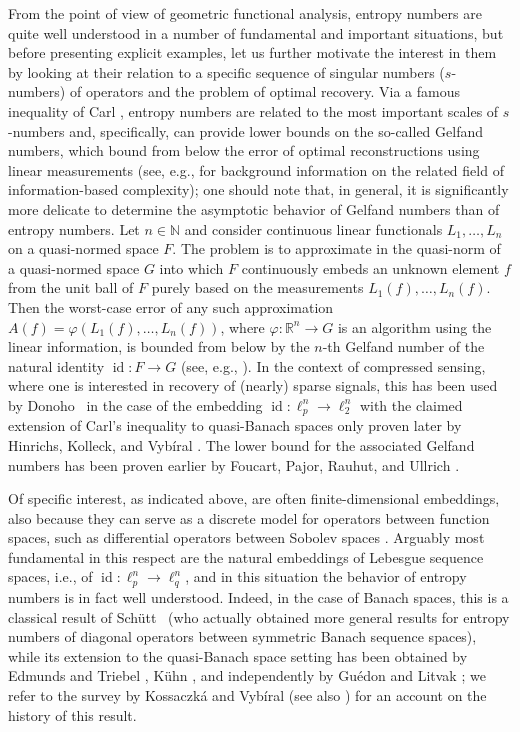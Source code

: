 \documentclass[a4paper,12pt]{article}
\theoremstyle{definition}
\newcommand{\N}{\mathbb{N}}
\newcommand{\IR}{\mathbb{R}}
\DeclareMathOperator{\id}{id}
\begin{document}
From the point of view of geometric functional analysis, entropy numbers are quite well understood in a number of fundamental and important situations, but before presenting explicit examples, let us further motivate the interest
in them by looking at their relation to a specific sequence of singular numbers ($s$-numbers) of operators and the problem of optimal recovery.  Via a famous inequality of Carl \cite{C1981}, entropy numbers are related to the most important scales of $s$-numbers and, specifically, can provide lower bounds on the so-called Gelfand numbers,
which bound from below the error of optimal reconstructions using linear measurements (see, e.g., \cite{NW08} for background information on the related field of information-based complexity); one should note that,
in general, it is significantly more delicate to determine the asymptotic behavior of Gelfand numbers than of entropy numbers. Let $n\in\N$ and consider continuous linear functionals $L_1,\dots,L_n$ on a quasi-normed space $F$.
The problem is to approximate in the quasi-norm of a quasi-normed space $G$ into which $F$ continuously embeds an unknown element $f$ from the unit ball of $F$ purely based on the measurements $L_1(f),\dots,L_n(f)$.
Then the worst-case error of any such approximation $A(f)=\varphi(L_1(f),\dots,L_n(f))$, where $\varphi\colon \IR^n\to G$ is an algorithm using the linear information, is bounded from below by the $n$-th Gelfand number
of the natural identity $\id\colon F\to G$ (see, e.g., \cite[Proposition 1.2]{FPR+10}). In the context of compressed sensing, where one is interested in recovery of (nearly) sparse signals, this has been used by Donoho~\cite{Don06} in the case of the embedding $\id\colon \ell_p^n \to \ell_2^n$ with the claimed extension of Carl's inequality to quasi-Banach spaces only proven later by Hinrichs, Kolleck, and Vyb\'iral \cite{HKV16}.
The lower bound for the associated Gelfand numbers has been proven earlier by Foucart, Pajor, Rauhut, and Ullrich \cite{FPR+10}.   

Of specific interest, as indicated above, are often finite-dimensional embeddings, also because they can serve as a discrete model for operators between function spaces, such as differential operators between Sobolev spaces \cite{ET96,K1986}.
Arguably most fundamental in this respect are the natural embeddings of Lebesgue sequence spaces, i.e., of  $\id:\ell_p^n\to\ell_q^n$, and in this situation the behavior of entropy numbers is in fact well understood. Indeed, in the case of Banach spaces, this is a classical result of Schütt~\cite{Sch84} (who actually obtained more general results for entropy numbers of diagonal operators between symmetric Banach sequence spaces), while its extension to the quasi-Banach space setting has been obtained by Edmunds and Triebel \cite[Sec. 3.2.2]{ET96}, Kühn \cite{Kue01}, and independently by Gu\'{e}don and Litvak \cite{GL00}; we refer to the survey \cite{KV20} by Kossaczk\'a and Vyb\'iral (see also \cite[Remark 3]{MU21}) for an account on the history of this result.
\end{document}
